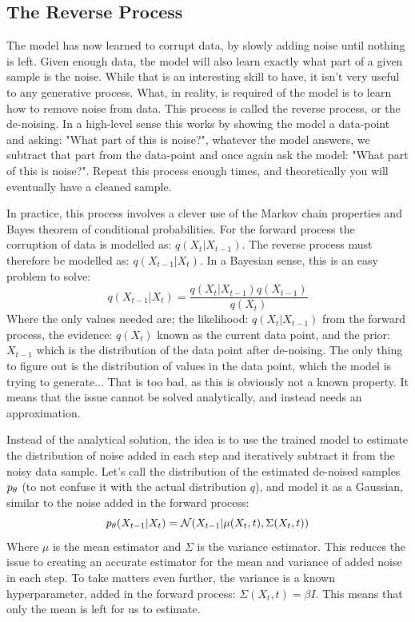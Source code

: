 \subsection{The Reverse Process}
The model has now learned to corrupt data, by slowly adding noise until nothing is left. Given enough data, the model will also learn exactly what part of a given sample is the noise. While that is an interesting skill to have, it isn't very useful to any generative process. What, in reality, is required of the model is to learn how to remove noise from data. This process is called the reverse process, or the de-noising. In a high-level sense this works by showing the model a data-point and asking: "What part of this is noise?", whatever the model answers, we subtract that part from the data-point and once again ask the model: "What part of this is noise?". Repeat this process enough times, and theoretically you will eventually have a cleaned sample. 

In practice, this process involves a clever use of the Markov chain properties and Bayes theorem of conditional probabilities. For the forward process the corruption of data is modelled as: $q(X_t|X_{t-1})$. The reverse process must therefore be modelled as: $q(X_{t-1}|X_t)$. In a Bayesian sense, this is an easy problem to solve:
\begin{equation}
    q(X_{t-1}|X_t) = \frac{q(X_t|X_{t-1}) q(X_{t-1})}{q(X_t)}
\end{equation}
Where the only values needed are; the likelihood: $q(X_t|X_{t-1})$ from the forward process, the evidence: $q(X_t)$ known as the current data point, and the prior: $X_{t-1}$ which is the distribution of the data point after de-noising. The only thing to figure out is the distribution of values in the data point, which the model is trying to generate... That is too bad, as this is obviously not a known property. It means that the issue cannot be solved analytically, and instead needs an approximation. 

Instead of the analytical solution, the idea is to use the trained model to estimate the distribution of noise added in each step and iteratively subtract it from the noisy data sample. Let's call the distribution of the estimated de-noised samples $p_{\theta}$ (to not confuse it with the actual distribution $q$), and model it as a Gaussian, similar to the noise added in the forward process:
\begin{equation}
    p_{\theta} (X_{t-1}|X_t) = \mathcal{N}(X_{t-1}| \mu(X_t,t), \Sigma(X_t, t))
\end{equation}
Where $\mu$ is the mean estimator and $\Sigma$ is the variance estimator.
This reduces the issue to creating an accurate estimator for the mean and variance of added noise in each step. To take matters even further, the variance is a known hyperparameter, added in the forward process: $\Sigma(X_t,t)=\beta I$. This means that only the mean is left for us to estimate.

